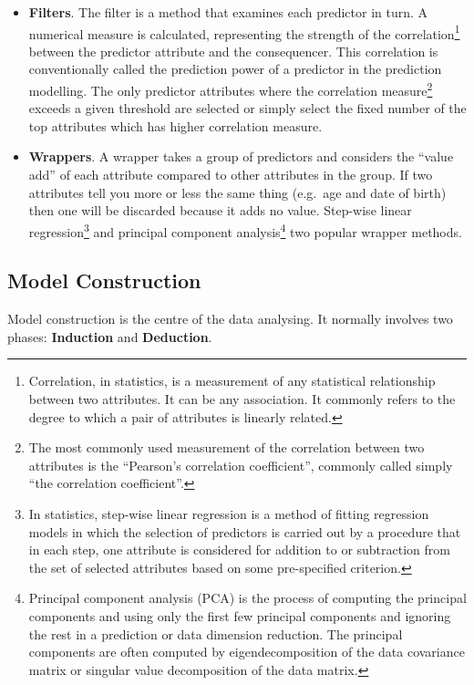 \documentclass[
]{book}
\begin{document}
\begin{itemize}
\item
  \textbf{Filters}. The filter is a method that examines each predictor in turn. A numerical measure is calculated, representing the strength of the correlation\footnote{Correlation, in statistics, is a measurement of any statistical relationship between two attributes. It can be any association. It commonly refers to the degree to which a pair of attributes is linearly related.} between the predictor attribute and the consequencer. This correlation is conventionally called the prediction power of a predictor in the prediction modelling. The only predictor attributes where the correlation measure\footnote{The most commonly used measurement of the correlation between two attributes is the ``Pearson's correlation coefficient'', commonly called simply ``the correlation coefficient''.} exceeds a given threshold are selected or simply select the fixed number of the top attributes which has higher correlation measure.
\item
  \textbf{Wrappers}. A wrapper takes a group of predictors and considers the ``value add'' of each attribute compared to other attributes in the group. If two attributes tell you more or less the same thing (e.g.~age and date of birth) then one will be discarded because it adds no value. Step-wise linear regression\footnote{In statistics, step-wise linear regression is a method of fitting regression models in which the selection of predictors is carried out by a procedure that in each step, one attribute is considered for addition to or subtraction from the set of selected attributes based on some pre-specified criterion.} and principal component analysis\footnote{Principal component analysis (PCA) is the process of computing the principal components and using only the first few principal components and ignoring the rest in a prediction or data dimension reduction. The principal components are often computed by eigendecomposition of the data covariance matrix or singular value decomposition of the data matrix.} two popular wrapper methods.
\end{itemize}

\hypertarget{model-construction}{%
\subsection*{Model Construction}\label{model-construction}}


Model construction is the centre of the data analysing. It normally involves two phases: \textbf{Induction} and \textbf{Deduction}.
\end{document}
